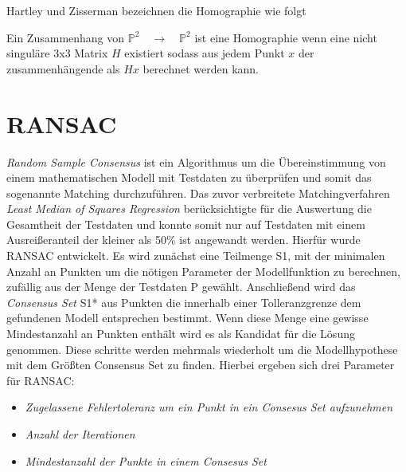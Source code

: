 Hartley und Zisserman bezeichnen die Homographie wie folgt\:

Ein Zusammenhang von $\mathbb{P}^2 \quad \rightarrow \quad \mathbb{P}^2$ ist eine Homographie wenn eine nicht singuläre 3x3 Matrix $H$ existiert sodass aus jedem Punkt $x$ der zusammenhängende als $Hx$ berechnet werden kann.
\section{RANSAC}
\emph{Random Sample Consensus} ist ein Algorithmus um die Übereinstimmung von einem mathematischen Modell mit Testdaten zu überprüfen und somit das sogenannte Matching durchzuführen.
Das zuvor verbreitete Matchingverfahren \emph{Least Median of Squares Regression} berücksichtigte für die Auswertung die Gesamtheit der Testdaten und konnte somit nur auf Testdaten mit einem Ausreißeranteil der kleiner als 50\% ist angewandt werden.
Hierfür wurde RANSAC entwickelt.
Es wird zunächst eine Teilmenge S1, mit der minimalen Anzahl an Punkten um die nötigen Parameter der Modellfunktion zu berechnen, zufällig aus der Menge der Testdaten P gewählt. 
Anschließend wird das \emph{Consensus Set} S1* aus Punkten die innerhalb einer Tolleranzgrenze dem gefundenen Modell entsprechen bestimmt.
Wenn diese Menge eine gewisse Mindestanzahl an Punkten enthält wird es als Kandidat für die Lösung genommen.
Diese schritte werden mehrmals wiederholt um die Modellhypothese mit dem Größten Consensus Set zu finden.
Hierbei ergeben sich drei Parameter für RANSAC:
\begin{itemize}
\item \emph{Zugelassene Fehlertoleranz um ein Punkt in ein Consesus Set aufzunehmen}
\item \emph{Anzahl der Iterationen}
\item \emph{Mindestanzahl der Punkte in einem Consesus Set}
\end{itemize}